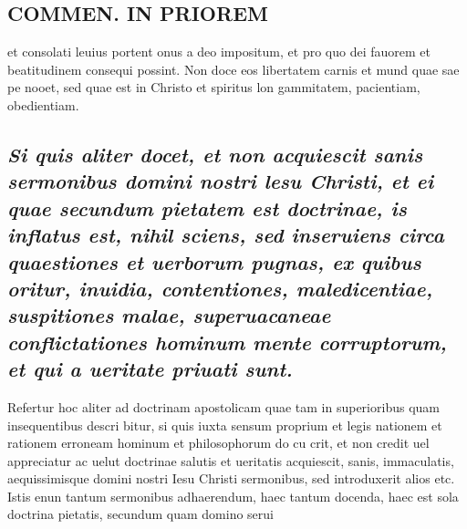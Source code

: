\documentclass{article}
\begin{document}
\begin{pages}
\section*{COMMEN. IN PRIOREM }
\marginpar{[ p.156 ]}\pstart et consolati leuius portent onus a deo impositum, et pro quo dei fauorem et beatitudinem consequi possint. Non doce eos libertatem carnis et mund quae sae pe nooet, sed quae est in Christo et spiritus lon gammitatem, pacientiam, obedientiam.  \pend
{}
{}
\subsection*{\textit{Si quis aliter docet, et non acquiescit sanis sermonibus domini nostri lesu Christi, et ei quae secundum pietatem est doctrinae, is inflatus est, nihil sciens, sed inseruiens circa quaestiones et uerborum pugnas, ex quibus oritur, inuidia, contentiones, maledicentiae, suspitiones malae, superuacaneae conflictationes hominum mente corruptorum, et qui a ueritate priuati sunt. }}\pstart Refertur hoc aliter ad doctrinam apostolicam quae tam in superioribus quam insequentibus descri bitur, si quis iuxta sensum proprium et legis nationem et rationem erroneam hominum et philosophorum do cu crit, et non credit uel appreciatur ac uelut doctrinae salutis et ueritatis acquiescit, sanis, immaculatis, aequissimisque domini nostri Iesu Christi sermonibus, sed introduxerit alios etc. Istis enun tantum sermonibus adhaerendum, haec tantum docenda, haec est sola doctrina pietatis, secundum quam domino serui\pend

\end{pages}
\end{document}
